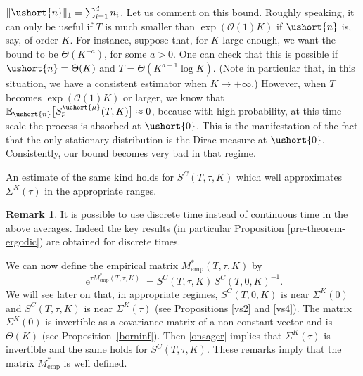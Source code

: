 \documentclass[10pt]{amsart}
\newcommand{\emp}{\mathrm{emp}}
\let\mathcal\mathscr
\numberwithin{equation}{section}
\theoremstyle{plain}
\theoremstyle{definition}
\newtheorem{remark}{Remark}[section]
\newcommand{\E}{{\mathbb{E}}}
\newcommand{\Oun}{\mathcal{O}(1)}
\newcommand{\sK}{K}
\newcommand{\vecn}{\ushort{n}}
\newcommand{\vmu}{\ushort{\mu}}
\newcommand{\veczer}{\ushort{0}}
\newcommand{\e}{\operatorname{e}}
\newcommand{\norm}[1]{\|#1\|_{1}}\let\snorm\norm
\begin{document}
$\norm{\vecn}=\sum_{i=1}^d n_i$.
Let us comment on this bound.
Roughly speaking, it can only be useful if $T$ is much smaller than $\exp(\Oun K)$ if $\vecn$ is, say, of order $K$.
For instance, suppose that, for $K$ large enough, we want the bound to be $\Theta(K^{-a})$, for some $a>0$. One can check that this is possible if
$\vecn=\Theta(K)$ and $T=\Theta(K^{a+1} \log K)$. (Note in particular that, in this situation, we have a consistent estimator when $K\to+\infty$.)
However, when $T$ becomes $\exp(\Oun K)$ or larger, we know that $\E_{\vecn}\bigl[S^{\vmu}_{p}(T,K)\bigr]\approx 0$, because with high
probability, at this time scale the process is absorbed at $\veczer$. This is the manifestation of the fact that the only stationary distribution is the Dirac
measure at $\veczer$. Consistently, our bound becomes very bad in that regime.

An estimate of the same kind holds for $S^{C}(T,\tau,K)$ which well approximates $\Sigma^{\sK}(\tau)$ in the appropriate ranges.

\begin{remark} It is possible to use discrete time instead of continuous time in the above averages. Indeed the key results (in particular Proposition
\ref{pre-theorem-ergodic}) are obtained for discrete times.
\end{remark}

We can now define the empirical matrix $M^{*}_\emp(T,\tau,K)$ by
\[
\e^{\tau M^{*}_\emp(T,\tau,K)}=S^{C}(T,\tau,K)\,S^{C}(T,0,K)^{-1}.
\]
We will see later on that, in appropriate regimes, $S^{C}(T,0,K)$ is near $\Sigma^K(0)$ and $S^{C}(T,\tau,K)$ is near $\Sigma^K(\tau)$
(see Propositions \ref{vs2} and \ref{vs4}). The matrix $\Sigma^K(0)$ is invertible as a covariance matrix of a non-constant vector and is $\Theta(K)$ (see Proposition~\ref{borninf}). Then \eqref{onsager} implies that $\Sigma^K(\tau)$ is invertible and the same holds for $S^{C}(T,\tau,K)$. These remarks imply
that the matrix $M^{*}_\emp$ is well defined.
\end{document}
